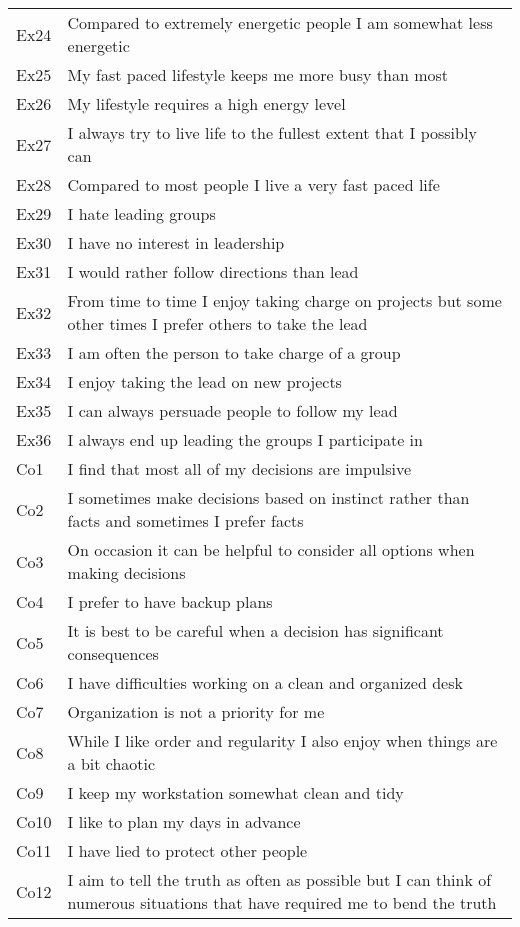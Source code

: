 \documentclass[english,man]{apa6}
\theoremstyle{definition}
\theoremstyle{definition}
\theoremstyle{remark}
\begin{document}
\begin{longtable}{ll}
Ex24 & Compared to extremely energetic people  I am somewhat less energetic\\
Ex25 & My fast paced lifestyle keeps me more busy than most\\
\addlinespace
Ex26 & My lifestyle requires a high energy level\\
Ex27 & I always try to live life to the fullest extent that I possibly can\\
Ex28 & Compared to most people  I live a very fast paced life\\
Ex29 & I hate leading groups\\
Ex30 & I have no interest in leadership\\
\addlinespace
Ex31 & I would rather follow directions than lead\\
Ex32 & From time to time  I enjoy taking charge on projects  but some other times I prefer others to take the lead\\
Ex33 & I am often the person to take charge of a group\\
Ex34 & I enjoy taking the lead on new projects\\
Ex35 & I can always persuade people to follow my lead\\
\addlinespace
Ex36 & I always end up leading the groups I participate in\\
Co1 & I find that most all of my decisions are impulsive\\
Co2 & I sometimes make decisions based on instinct rather than facts  and sometimes I prefer facts\\
Co3 & On occasion it can be helpful to consider all options when making decisions\\
Co4 & I prefer to have backup plans\\
\addlinespace
Co5 & It is best to be careful when a decision has significant consequences\\
Co6 & I have difficulties working on a clean and organized desk\\
Co7 & Organization is not a priority for me\\
Co8 & While I like order and regularity  I also enjoy when things are a bit chaotic\\
Co9 & I keep my workstation somewhat clean and tidy\\
\addlinespace
Co10 & I like to plan my days in advance\\
Co11 & I have lied to protect other people\\
Co12 & I aim to tell the truth as often as possible  but I can think of numerous situations that have required me to bend the truth\\

\end{longtable}
\end{document}
